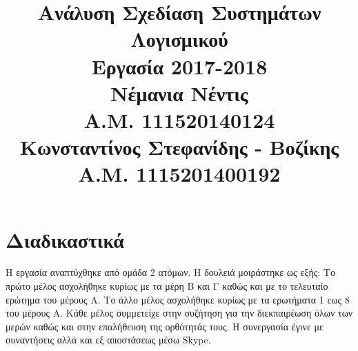 \documentclass[12pt]{article}
\title{{Ανάλυση Σχεδίαση Συστημάτων Λογισμικού} \\
\vspace{2cm}
{\Huge Εργασία 2017-2018} \\
\vspace{2cm}
{Νέμανια Νέντις}\\
{Α.Μ. 111520140124}\\
{Κωνσταντίνος Στεφανίδης - Βοζίκης}\\
{Α.Μ. 1115201400192}}
\date{}
\begin{document}
\maketitle
\newpage
\tableofcontents
\newpage

\section{Διαδικαστικά}
Η εργασία αναπτύχθηκε από ομάδα 2 ατόμων. Η δουλειά μοιράστηκε ως εξής: 
Το πρώτο μέλος ασχολήθηκε κυρίως με τα μέρη Β και Γ καθώς και με το τελευταίο 
ερώτημα του μέρους Α. Το άλλο μέλος ασχολήθηκε κυρίως με τα ερωτήματα 1 εως 8 
του μέρους Α. Κάθε μέλος συμμετείχε στην συζήτηση για την διεκπαιρέωση 
όλων των μερών καθώς και στην επαλήθευση της ορθότητάς τους. Η συνεργασία έγινε 
με συναντήσεις αλλά και εξ αποστάσεως μέσω \textlatin{Skype}.
\end{document}
